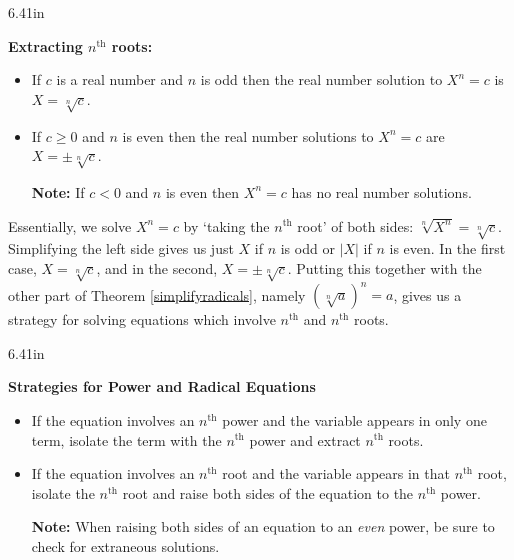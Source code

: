 \documentclass[11pt]{article}
\theoremstyle{definition}  %
\newcommand{\bbm}{\begin{boxedminipage}{6.41in}}
\newcommand{\ebm}{\end{boxedminipage}}
\begin{document}
\medskip

\colorbox{ResultColor}{\bbm

\centerline{\textbf{Extracting $n^{\text{th}}$ roots:}}

\begin{itemize}

\item If $c$ is a real number and $n$ is odd then the real number solution to $X^{n} = c$ is $X = \sqrt[n]{c}$.

\item  If $c \geq 0$ and $n$ is even then the real number solutions to $X^{n} = c$ are $X = \pm \sqrt[n]{c}$.

\textbf{Note:} If $c < 0$ and $n$ is even then $X^{n} = c$ has no real number solutions.

\end{itemize}

\ebm}

\medskip

Essentially, we solve $X^{n} = c$ by `taking the $n^{\text{th}}$ root' of both sides:  $\sqrt[n]{X^{n}} = \sqrt[n]{c}$. Simplifying the left side gives us just $X$ if $n$ is odd or $|X|$ if $n$ is even.  In the first case,  $X =  \sqrt[n]{c}$, and in the second, $X = \pm \sqrt[n]{c}$.  Putting this together with the other part of Theorem \ref{simplifyradicals}, namely $(\sqrt[n]{a})^n = a$, gives us a strategy for solving equations which involve $n^{\text{th}}$ and $n^{\text{th}}$ roots. 

\label{solvepowerandradicaleqns}

\medskip

\colorbox{ResultColor}{\bbm
\centerline{\textbf{Strategies for Power and Radical Equations}}

\begin{itemize}

\item  If the equation involves an $n^{\text{th}}$ power and the variable appears in only one term, isolate the term with the $n^{\text{th}}$ power and extract $n^{\text{th}}$ roots.

\item  If the equation involves an $n^{\text{th}}$ root and the variable appears in that $n^{\text{th}}$ root, isolate the $n^{\text{th}}$ root and raise both sides of the equation to the $n^{\text{th}}$ power.

\textbf{Note:}  When raising both sides of an equation to an \textit{even} power, be sure to check for extraneous solutions.

\end{itemize}

\ebm}
\end{document}
